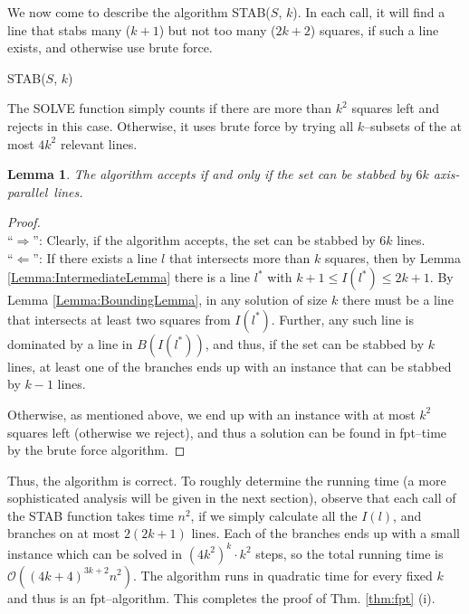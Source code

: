 \documentclass[12pt]{article}
\newtheorem{lemma}[definition]{Lemma}
\newcommand{\ap}{a.p.\ }
\renewcommand{\ap}{axis-parallel\ }
\newcommand{\order}{\mathcal{O}}
\begin{document}
We now come to describe the algorithm STAB($S$, $k$). In each call, it will find a line that stabs many ($k + 1$) but not too many ($2k + 2$) squares, if such a line exists, and otherwise use brute force.

\begin{algorithm}
\caption{STAB($S$, $k$)}
\label{alg:fpt1}
\begin{algorithmic}
 \RETURN 
\ENDIF
{}
  \ENDFOR
\ELSE
\ENDIF 
\end{algorithmic}
\end{algorithm}  



The SOLVE function simply counts if there are more than $k^2$ squares left and rejects in this case. Otherwise, it uses brute force by trying all $k$--subsets of the at most $4k^2$ relevant lines.
\begin{lemma} The algorithm accepts if and only if the set can be stabbed by $6k$ \ap lines.
\end{lemma}
\begin{proof}\ \\
``$\Rightarrow$'': Clearly, if the algorithm accepts, the set can be stabbed by $6k$ lines.\\
``$\Leftarrow$'': If there exists a line $l$ that intersects more than $k$ squares, then by Lemma \ref{Lemma:IntermediateLemma} there is a line $l^*$ with $k+1 \leq I(l^*) \leq 2k + 1$. By Lemma \ref{Lemma:BoundingLemma}, in any solution of size $k$ there must be a line that intersects at least two squares from $I(l^*)$. Further, any such line is dominated by a line in $B(I(l^*))$, and thus, if the set can be stabbed by $k$ lines, at least one of the branches ends up with an instance that can be stabbed by $k-1$ lines.

Otherwise, as mentioned above, we end up with an instance with at most $k^2$ squares left (otherwise we reject), and thus a solution can be found in fpt--time by the brute force algorithm.

\end{proof}
Thus, the algorithm is correct. To roughly determine the running time (a more sophisticated analysis will be given in the next section), observe that each call of the STAB function takes time $n^2$, if we simply calculate all the $I(l)$, and branches on at most $2(2k + 1)$ lines. Each of the branches ends up with a small instance which can be solved in $(4k^2)^k\cdot k^2$ steps, so the total running time is $\order\left((4k + 4)^{3k + 2}n^2\right)$. The algorithm runs in quadratic time for every fixed $k$ and thus is an fpt--algorithm. This completes the proof of Thm. \ref{thm:fpt} (i).
\end{document}
